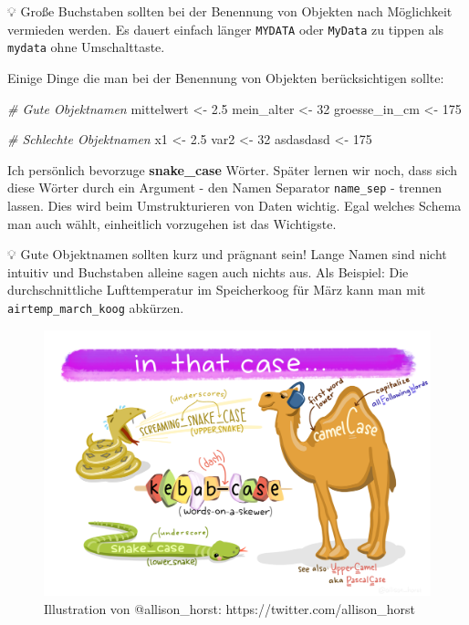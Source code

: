 \documentclass[
]{article}
\newenvironment{Shaded}{\begin{snugshade}}{\end{snugshade}}
\newcommand{\CommentTok}[1]{\textcolor[rgb]{0.56,0.35,0.01}{\textit{#1}}}
\newcommand{\DecValTok}[1]{\textcolor[rgb]{0.00,0.00,0.81}{#1}}
\newcommand{\FloatTok}[1]{\textcolor[rgb]{0.00,0.00,0.81}{#1}}
\newcommand{\NormalTok}[1]{#1}
\newcommand{\OtherTok}[1]{\textcolor[rgb]{0.56,0.35,0.01}{#1}}
\begin{document}
💡 Große Buchstaben sollten bei der Benennung von Objekten nach Möglichkeit vermieden werden. Es dauert einfach länger \texttt{MYDATA} oder \texttt{MyData} zu tippen als \texttt{mydata} ohne Umschalttaste.

Einige Dinge die man bei der Benennung von Objekten berücksichtigen sollte:

\begin{Shaded}
\begin{Highlighting}[]
\CommentTok{\# Gute Objektnamen}
\NormalTok{mittelwert }\OtherTok{\textless{}{-}} \FloatTok{2.5}
\NormalTok{mein\_alter }\OtherTok{\textless{}{-}} \DecValTok{32}
\NormalTok{groesse\_in\_cm }\OtherTok{\textless{}{-}} \DecValTok{175}

\CommentTok{\# Schlechte Objektnamen}
\NormalTok{x1 }\OtherTok{\textless{}{-}} \FloatTok{2.5}
\NormalTok{var2 }\OtherTok{\textless{}{-}} \DecValTok{32}
\NormalTok{asdasdasd }\OtherTok{\textless{}{-}} \DecValTok{175}
\end{Highlighting}
\end{Shaded}

Ich persönlich bevorzuge \textbf{snake\_case} Wörter. Später lernen wir noch, dass sich diese Wörter durch ein Argument - den Namen Separator \texttt{name\_sep} - trennen lassen. Dies wird beim Umstrukturieren von Daten wichtig. Egal welches Schema man auch wählt, einheitlich vorzugehen ist das Wichtigste.

💡 Gute Objektnamen sollten kurz und prägnant sein! Lange Namen sind nicht intuitiv und Buchstaben alleine sagen auch nichts aus. Als Beispiel: Die durchschnittliche Lufttemperatur im Speicherkoog für März kann man mit \texttt{airtemp\_march\_koog} abkürzen.

\begin{figure}

{\centering \includegraphics[width=1\linewidth]{images/016} 

}

\caption{Illustration von @allison_horst: https://twitter.com/allison_horst}\label{fig:unnamed-chunk-33}
\end{figure}
\end{document}
